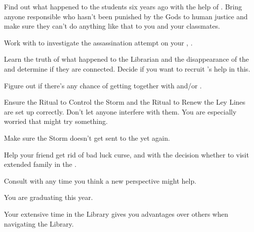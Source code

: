 \documentclass[char]{GL2020}
\begin{document}
\begin{itemz}
    \item Find out what happened to the students six years ago with the help of \cHeir{}. Bring anyone responsible who hasn't been punished by the Gods to human justice and make sure they can't do anything like that to you and your classmates.
    \item Work with \cJuniorStatesman{} to investigate the assassination attempt on your \cHeadDiplomat{\auncle}, \cHeadDiplomat{}.
    \item Learn the truth of what happened to the Librarian and the disappearance of the \iScythe{} and determine if they are connected. Decide if you want to recruit \cLibAssist{}’s help in this.

    \item Figure out if there's any chance of getting together with \cHeir{} and/or \cChupStudent{}.
\end{itemz}

\begin{itemz}
    \item Ensure the Ritual to Control the Storm and the Ritual to Renew the Ley Lines are set up correctly. Don't let anyone interfere with them. You are especially worried that \cPirateChild{} might try something.
    \item Make sure the Storm doesn't get sent to the \pShip{} yet again.
    \item Help your friend \cInitiate{} get rid of \cInitiate{\their} bad luck curse, and with the decision whether to visit \cInitiate{\their} extended family in the \pFarm{}.
    \item Consult with \cChupSecond{} any time you think a new perspective might help.
\end{itemz}

\begin{itemz}[Notes]
    \item You are graduating this year.
    \item Your extensive time in the Library gives you advantages over others when navigating the Library.
\end{itemz}
\end{document}
